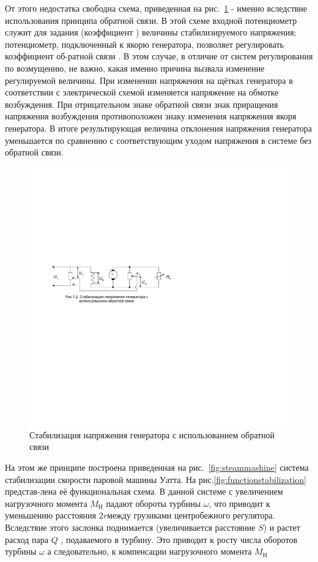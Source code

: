 От этого недостатка свободна схема, приведенная на рис.~\ref{fig:stabilizaciyanapryazenia} - именно вследствие использования принципа обратной связи. В этой схеме входной потенциометр служит для задания (коэффициент ) величины стабилизируемого напряжения; потенциометр, подключенный к якорю генератора, позволяет регулировать коэффициент об-ратной связи . В этом случае, в отличие от систем регулирования по возмущению, не важно, какая именно причина вызвала изменение регулируемой величины. При изменении напряжения на щётках генератора в соответствии с электрической схемой изменяется напряжение на обмотке возбуждения. При отрицательном знаке обратной связи знак приращения напряжения возбуждения противоположен знаку изменения напряжения якоря генератора. В итоге результирующая величина отклонения напряжения генератора уменьшается по сравнению с соответствующим уходом напряжения в системе без обратной связи. 

\begin{figure}[h]
	\centering
	\includegraphics[scale=0.95]{images/StabilizaciyaNapryazenia}
	\caption{Стабилизация напряжения генератора с использованием обратной связи}
	\label{fig:stabilizaciyanapryazenia}
\end{figure}

На этом же принципе построена приведенная на рис.~\ref{fig:steammashine} система стабилизации скорости паровой машины Уатта. На рис.\ref{fig:functionstabilization} представ-лена её функциональная схема. В данной системе с увеличением нагрузочного момента $ M_{Н} $ падают обороты турбины $ \omega $, что приводит к уменьшению расстояния $ 2r $между грузиками центробежного регулятора. Вследствие этого заслонка поднимается (увеличивается расстояние $ S $) и растет расход пара $ Q $ , подаваемого в турбину. Это приводит к росту числа оборотов турбины $ \omega $ а следовательно, к компенсации нагрузочного момента $ M_{Н} $

